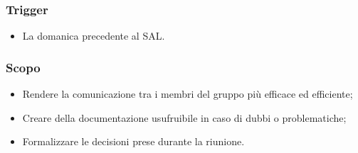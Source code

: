 \subsubsection*{Trigger}
\begin{itemize}
	\item La domanica precedente al SAL\g.
\end{itemize}

\subsubsection*{Scopo}
\begin{itemize}
	\item Rendere la comunicazione tra i membri del gruppo più efficace ed
	      efficiente;

	\item Creare della documentazione usufruibile in caso di dubbi o
	      problematiche;

	\item Formalizzare le decisioni prese durante la riunione.
\end{itemize}

